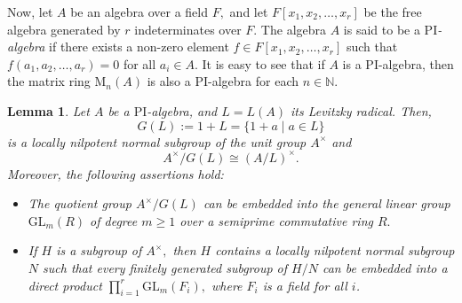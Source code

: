 \documentclass{amsart}
\newtheorem{lemma}[theorem]{Lemma}
\theoremstyle{definition}
\begin{document}
Now, let $A$ be an algebra over a field $F,$ and let $F[x_1,x_2,\ldots, x_r]$ be the free algebra generated by $r$ indeterminates over $F.$ The algebra $A$ is said to be a \textit{$\mathrm{PI}$-algebra} if there exists a non-zero element $f\in F[x_1,x_2,\ldots, x_r]$ such that $f(a_1,a_2,\ldots, a_r)=0$ for all $a_i\in A.$ It is easy to see that if $A$ is a $\mathrm{PI}$-algebra, then the matrix ring $\mathrm{M}_n(A)$ is also a $\mathrm{PI}$-algebra for each $n\in\mathbb{N}.$ 
\begin{lemma}\label{lem:7.1} Let $A$ be a $\mathrm{PI}$-algebra, and $L=L(A)$ its Levitzky radical.  Then, $$G(L):=1+L=\{1+a\mid a\in L\}$$ is a locally nilpotent normal subgroup of the unit group $A^\times$ and $$A^\times/G(L)\cong (A/L)^\times.$$ Moreover, the following assertions hold:
\begin{itemize}
\item [(1)] The quotient group $A^\times/G(L)$ can be embedded into the general linear group $\mathrm{GL}_m(R)$ of degree $m\geq 1$ over a semiprime commutative ring $R.$
\item [(2)] If $H$ is a subgroup of $A^\times,$ then $H$ contains a locally nilpotent normal subgroup $N$ such that every finitely generated subgroup of $H/N$ can be embedded into a direct product $\prod_{i=1}^{r}\mathrm{GL}_m(F_i),$ where $F_i$ is a field for all $i$.
     \end{itemize}
\end{lemma} 
\end{document}
